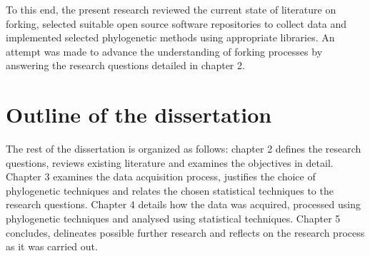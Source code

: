 To this end, the present research reviewed the current state of literature on forking, selected suitable open source software repositories to collect data and implemented selected phylogenetic methods using appropriate libraries. An attempt was made to advance the understanding of forking processes by answering the research questions detailed in chapter 2.


\section{Outline of the dissertation}
The rest of the dissertation is organized as follows: chapter 2 defines the research questions, reviews existing literature and examines the objectives in detail. Chapter 3 examines the data acquisition process, justifies the choice of phylogenetic techniques and relates the chosen statistical techniques to the research questions. Chapter 4 details how the data was acquired, processed using phylogenetic techniques and analysed using statistical techniques. Chapter 5 concludes, delineates possible further research and reflects on the research process as it was carried out.
